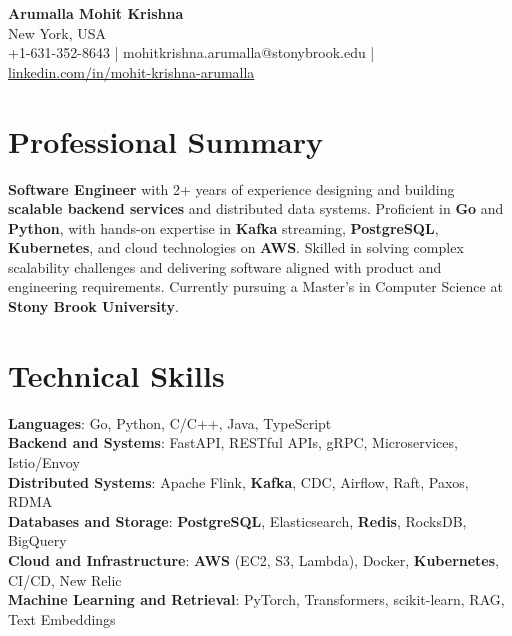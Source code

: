 \documentclass[letterpaper,11pt]{article}
\begin{document}
\begin{center}
  {\Large \textbf{Arumalla Mohit Krishna}} \\
  New York, USA \\
  +1-631-352-8643 \enspace | \enspace mohitkrishna.arumalla@stonybrook.edu \enspace | \enspace \href{https://www.linkedin.com/in/mohit-krishna-arumalla}{linkedin.com/in/mohit-krishna-arumalla}
\end{center}

\section{Professional Summary}
  \begin{itemize}[leftmargin=0.15in, label={}]
    \small{\item{
     \textbf{Software Engineer} with 2+ years of experience designing and building \textbf{scalable backend services} and distributed data systems. Proficient in \textbf{Go} and \textbf{Python}, with hands-on expertise in \textbf{Kafka} streaming, \textbf{PostgreSQL}, \textbf{Kubernetes}, and cloud technologies on \textbf{AWS}. Skilled in solving complex scalability challenges and delivering software aligned with product and engineering requirements. Currently pursuing a Master’s in Computer Science at \textbf{Stony Brook University}.
    }}
  \end{itemize}
\vspace{-16pt}

\section{Technical Skills}
 \begin{itemize}[leftmargin=0.15in, label={}]
    \small{\item{
     \textbf{Languages}: Go, Python, C/C++, Java, TypeScript \\
     \textbf{Backend and Systems}: FastAPI, RESTful APIs, gRPC, Microservices, Istio/Envoy \\
     \textbf{Distributed Systems}: Apache Flink, \textbf{Kafka}, CDC, Airflow, Raft, Paxos, RDMA \\
     \textbf{Databases and Storage}: \textbf{PostgreSQL}, Elasticsearch, \textbf{Redis}, RocksDB, BigQuery \\
     \textbf{Cloud and Infrastructure}: \textbf{AWS} (EC2, S3, Lambda), Docker, \textbf{Kubernetes}, CI/CD, New Relic \\
     \textbf{Machine Learning and Retrieval}: PyTorch, Transformers, scikit-learn, RAG, Text Embeddings
    }}
 \end{itemize}
\vspace{-16pt}
\end{document}
